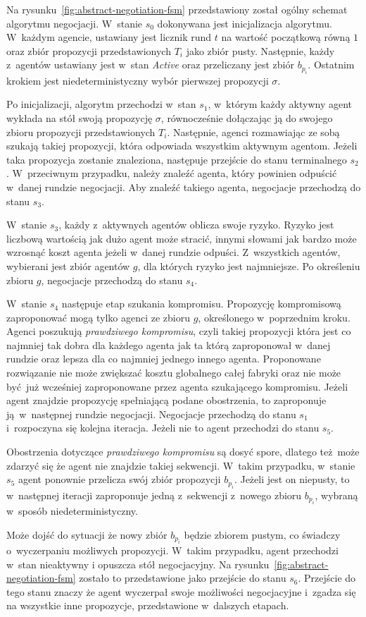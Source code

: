 Na rysunku~\ref{fig:abstract-negotiation-fsm} przedstawiony został ogólny schemat algorytmu negocjacji. W~stanie $s_{0}$ dokonywana jest inicjalizacja algorytmu. W~każdym agencie, ustawiany jest licznik rund $t$ na wartość początkową równą $1$ oraz zbiór propozycji przedstawionych $T_{i}$ jako zbiór pusty. Następnie, każdy z~agentów ustawiany jest w~stan \textit{Active} oraz przeliczany jest zbiór $b_{p_{i}}$. Ostatnim krokiem jest niedeterministyczny wybór pierwszej propozycji $\sigma$.

Po inicjalizacji, algorytm przechodzi w~stan $s_{1}$, w~którym każdy aktywny agent wykłada na stół swoją propozycję $\sigma$, równocześnie dołączając ją do swojego zbioru propozycji przedstawionych $T_{i}$. Następnie, agenci rozmawiając ze sobą szukają takiej propozycji, która odpowiada wszystkim aktywnym agentom. Jeżeli taka propozycja zostanie znaleziona, następuje przejście do stanu terminalnego $s_{2}$. W~przeciwnym przypadku, należy znaleźć agenta, który powinien odpuścić w~danej rundzie negocjacji. Aby znaleźć takiego agenta, negocjacje przechodzą do stanu $s_{3}$.

W~stanie $s_{3}$, każdy z~aktywnych agentów oblicza swoje ryzyko. Ryzyko jest liczbową wartością jak dużo agent może stracić, innymi słowami jak bardzo może wzrosnąć koszt agenta jeżeli w~danej rundzie odpuści. Z~wszystkich agentów, wybierani jest zbiór agentów $g$, dla których ryzyko jest najmniejsze. Po określeniu zbioru $g$, negocjacje przechodzą do stanu $s_{4}$.

W~stanie $s_{4}$ następuje etap szukania kompromisu. Propozycję kompromisową zaproponować mogą tylko agenci ze zbioru $g$, określonego w~poprzednim kroku. Agenci poszukują \emph{prawdziwego kompromisu}, czyli takiej propozycji która jest co najmniej tak dobra dla każdego agenta jak ta którą zaproponował w~danej rundzie oraz lepsza dla co najmniej jednego innego agenta. Proponowane rozwiązanie nie może zwiększać kosztu globalnego całej fabryki oraz nie może być już wcześniej zaproponowane przez agenta szukającego kompromisu. Jeżeli agent znajdzie propozycję spełniającą podane obostrzenia, to zaproponuje ją w~następnej rundzie negocjacji. Negocjacje przechodzą do stanu $s_{1}$ i~rozpoczyna się kolejna iteracja. Jeżeli nie to agent przechodzi do stanu $s_{5}$.

Obostrzenia dotyczące \emph{prawdziwego kompromisu} są dosyć spore, dlatego też może zdarzyć się że agent nie znajdzie takiej sekwencji. W~takim przypadku, w~stanie $s_{5}$ agent ponownie przelicza swój zbiór propozycji $b_{p_{i}}$. Jeżeli jest on niepusty, to w~następnej iteracji zaproponuje jedną z~sekwencji z~nowego zbioru $b_{p_{i}}$, wybraną w~sposób niedeterministyczny.

Może dojść do sytuacji że nowy zbiór $b_{p_{i}}$ będzie zbiorem pustym, co świadczy o~wyczerpaniu możliwych propozycji. W~takim przypadku, agent przechodzi w~stan nieaktywny i opuszcza stół negocjacyjny. Na rysunku~\ref{fig:abstract-negotiation-fsm} zostało to przedstawione jako przejście do stanu $s_{6}$. Przejście do tego stanu znaczy że agent wyczerpał swoje możliwości negocjacyjne i~zgadza się na wszystkie inne propozycje, przedstawione w~dalszych etapach.

